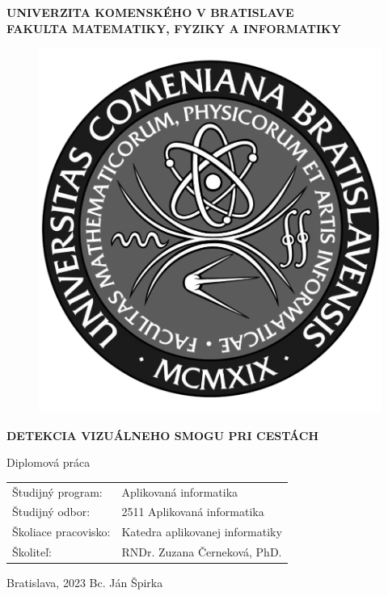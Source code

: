 \documentclass[12pt, a4paper, oneside]{book}
\newcommand\mftitle{Detekcia vizuálneho smogu pri cestách}
\newcommand\mfthesistype{Diplomová práca}
\newcommand\mfauthor{Bc. Ján Špirka}
\newcommand\mfadvisor{RNDr. Zuzana Černeková, PhD.}
\newcommand\mfplacedate{Bratislava, 2023}
\newcommand\mfuniversity{UNIVERZITA KOMENSKÉHO V BRATISLAVE}
\newcommand\mffaculty{FAKULTA MATEMATIKY, FYZIKY A INFORMATIKY}
\begin{document}
\thispagestyle{empty}

\noindent
\begin{minipage}{\textwidth}
\begin{center}
\textbf{\mfuniversity \\
\mffaculty}
\end{center}
\end{minipage}

\vfill
\begin{figure}[!hbt]
\begin{center}
\includegraphics{images/logo_fmph_dark}
\label{img:logo_dark}
\end{center}
\end{figure}
\begin{center}
\begin{minipage}{0.8\textwidth}
\centerline{\textbf{\Large\MakeUppercase{\mftitle}}}
\smallskip
\centerline{\mfthesistype}
\end{minipage}
\end{center}
\vfill
\begin{tabular}{l l}
Študijný program: & Aplikovaná informatika\\
Študijný odbor: & 2511 Aplikovaná informatika\\
Školiace pracovisko: & Katedra aplikovanej informatiky\\
Školiteľ: & \mfadvisor
\end{tabular}
\vfill
\noindent
\mfplacedate \hfill
\mfauthor
\eject 
\end{document}
